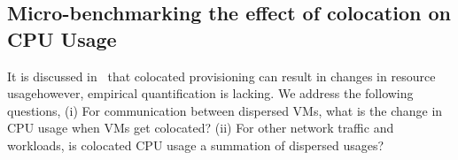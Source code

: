 
\subsection{Micro-benchmarking the effect of colocation on CPU Usage}
It is discussed in~\cite{virtual-putty}
that colocated provisioning can result in changes in
resource usage\textemdash{}however, empirical quantification is lacking.
We address the following questions,
(i) For communication between dispersed VMs, what is the 
change in CPU usage when VMs get colocated? 
(ii) For other network traffic and workloads, is colocated CPU usage a 
summation of dispersed usages?


